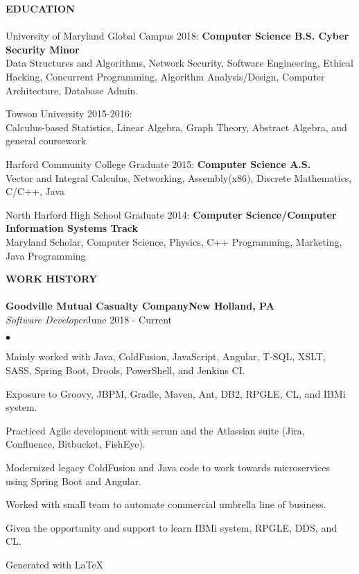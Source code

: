 \documentclass{article}
\newcommand{\lineunder}{
	\vspace*{-4pt}\\ 
	\hspace*{-18pt}\hrulefill \\
}
\newcommand{\header}[1]{
	{\hspace*{-15pt}\vspace*{6pt}\textsc{#1}}\vspace*{-6pt}\lineunder
}
\newcommand{\employer}[5]{
	{\textbf{#1}{\hfill\textbf{#2}}\\ 
	{{\emph{#3}}}\hfill {#4}\\ \hfill {#5}}
}
\newcommand{\education}[3]{
	{#1} \textbf{#2}\\
	{\hspace*{12pt}#3 }\\ 
	\vspace*{5pt}
}
\newenvironment{resumecontent}{
	\begin{list}
		{\small$\bullet$}{\topsep 0pt \itemsep -2pt}}{\vspace*{4pt}
	\end{list}
}
\newcommand{\resumeheader}[1]{
	\vspace*{5pt}
	\header{\textbf{#1}}
}
\begin{document}
	\resumeheader{EDUCATION}
		\education
			{University of Maryland Global Campus 2018:} 
			{Computer Science B.S. Cyber Security Minor}
			{Data Structures and Algorithms, Network Security, Software Engineering, Ethical Hacking, Concurrent
			\hspace*{12pt}Programming, Algorithm Analysis/Design, Computer Architecture, Database Admin.}
		\education
			{Towson University 2015-2016:} 
			{}
			{Calculus-based Statistics, Linear Algebra, Graph Theory, Abstract Algebra, and general coursework}
		\education
			{Harford Community College Graduate 2015:}
			{Computer Science A.S.}
			{Vector and Integral Calculus, Networking, Assembly(x86), Discrete Mathematics, C/C++, Java}
		\education
			{North Harford High School Graduate 2014:} 
			{Computer Science/Computer Information Systems Track}
			{Maryland Scholar, Computer Science, Physics, C++ Programming, Marketing, Java Programming}

	\resumeheader{WORK HISTORY}
		\employer{Goodville Mutual Casualty Company}{New Holland, PA}{Software Developer} {June 2018 - Current} {}
			\vspace*{-8pt}
			\begin{resumecontent}
				\item Mainly worked with Java, ColdFusion, JavaScript, Angular, T-SQL, XSLT, SASS, Spring Boot, Drools, PowerShell, and Jenkins CI.
				\item Exposure to Groovy, JBPM, Gradle, Maven, Ant, DB2, RPGLE, CL, and IBMi system.
				\item Practiced Agile development with scrum and the Atlassian suite (Jira, Confluence, Bitbucket, FishEye).
				\item Modernized legacy ColdFusion and Java code to work towards microservices using Spring Boot and Angular.
				\item Worked with small team to automate commercial umbrella line of business.
				\item Given the opportunity and support to learn IBMi system, RPGLE, DDS, and CL.
			\end{resumecontent}

	\begin{center}
		\small 
		\vspace*{18pt} Generated with \LaTeX
	\end{center}
\end{document}
